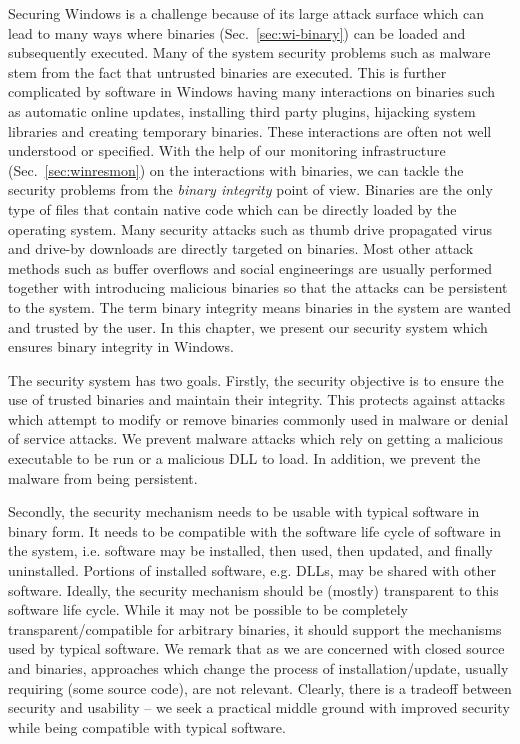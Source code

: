 Securing Windows is a challenge because of its large
attack surface which can lead to many ways where
binaries (Sec.~\ref{sec:wi-binary}) can be loaded and subsequently executed.
Many of the system security problems such as malware
stem from the fact that untrusted binaries are executed.
This is further complicated by
software in Windows having many interactions on binaries such as
automatic online updates, installing third party plugins,
hijacking system libraries and creating temporary binaries.
These interactions are often not well understood or specified.
With the help of our monitoring infrastructure (Sec.~\ref{sec:winresmon})
on the interactions with binaries,
we can tackle the security problems from the {\em binary integrity}
point of view.
Binaries are the only type of files that contain native code which
can be directly loaded by the operating system.
Many security attacks such as thumb drive propagated virus and
drive-by downloads are directly targeted on binaries.
Most other attack methods such as buffer overflows and social engineerings
are usually performed together with introducing malicious binaries
so that the attacks can be persistent to the system.
The term binary integrity means binaries in the system are
wanted and trusted by the user.
In this chapter, we present our security system which ensures
binary integrity in Windows.

The security system has two goals. Firstly, the security objective
is to ensure the use of trusted binaries and maintain their integrity.
This protects against attacks which attempt to modify or remove binaries
commonly used in malware or denial of service attacks.
We prevent malware attacks which rely on
getting a malicious executable to be run or
a malicious DLL to load.
In addition, we prevent the malware from being persistent.

Secondly, the security mechanism needs to be usable with typical
software in binary form.
It needs to be compatible with the software life cycle of software in the
system, i.e.
software may be installed, then used, then updated, and 
finally uninstalled. 
Portions of installed software, e.g. DLLs,
may be shared with other software. 
Ideally, the security mechanism should be (mostly) transparent to 
this software life cycle.
While it may not be possible to be completely transparent/compatible 
for arbitrary binaries, it should support the mechanisms used 
by typical software.
We remark that as we are concerned with
closed source and binaries,
approaches which change the process of installation/update,
usually requiring (some source code), are not relevant.
Clearly, there is a tradeoff between security and usability --
we seek a practical middle ground with improved security while
being compatible with typical software.

